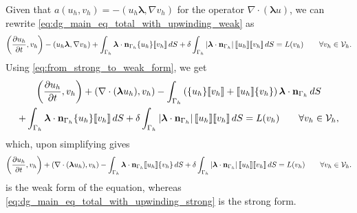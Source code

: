 \documentclass[oneside,a4paper,11pt]{report}
\begin{document}
Given that $a(u_h, v_h) = -(u_h \boldsymbol{\lambda}, \nabla v_h)$ for the operator $\nabla \cdot (\boldsymbol{\lambda} u)$, we can rewrite \cref{eq:dg_main_eq_total_with_upwinding_weak} as
\begin{equation}
    \left ( \frac{\partial u_h}{\partial t} , v_h \right ) - (u_h \boldsymbol{\lambda}, \nabla v_h) + \int_{\Gamma_h} \bm \lambda \cdot \mathbf{n}_{\Gamma_h} \{ u_h \} \llbracket v_h \rrbracket \, dS + \delta \int_{\Gamma_h} \left | \boldsymbol{\lambda} \cdot \mathbf{n}_{\Gamma_h} \right | \llbracket u_h \rrbracket \llbracket v_h \rrbracket \, dS = L(v_h) \qquad \forall v_h \in \mathcal{V}_h.
\end{equation}
Using \cref{eq:from_strong_to_weak_form}, we get
\begin{multline}
    \left ( \frac{\partial u_h}{\partial t} , v_h \right ) + (\nabla \cdot ( \boldsymbol{\lambda} u_h ), v_h ) -\int_{\Gamma_h} \left ( \{ u_h \} \llbracket v_h \rrbracket + \llbracket u_h \rrbracket \{ v_h \} \right ) \boldsymbol{\lambda} \cdot \mathbf{n}_{\Gamma_h} \, dS\\
    + \int_{\Gamma_h} \bm \lambda \cdot \mathbf{n}_{\Gamma_h} \{ u_h \} \llbracket v_h \rrbracket \, dS + \delta \int_{\Gamma_h} \left | \boldsymbol{\lambda} \cdot \mathbf{n}_{\Gamma_h} \right | \llbracket u_h \rrbracket \llbracket v_h \rrbracket \, dS = L(v_h) \qquad \forall v_h \in \mathcal{V}_h,
\end{multline}
which, upon simplifying gives
\begin{equation}
    \label{eq:dg_main_eq_total_with_upwinding_strong}
    \left ( \frac{\partial u_h}{\partial t} , v_h \right ) + (\nabla \cdot ( \boldsymbol{\lambda} u_h ), v_h ) -\int_{\Gamma_h} \boldsymbol{\lambda} \cdot \mathbf{n}_{\Gamma_h}\llbracket u_h \rrbracket \{ v_h \} \, dS + \delta \int_{\Gamma_h} \left | \boldsymbol{\lambda} \cdot \mathbf{n}_{\Gamma_h} \right | \llbracket u_h \rrbracket \llbracket v_h \rrbracket \, dS = L(v_h) \qquad \forall v_h \in \mathcal{V}_h.
\end{equation}
 is the weak form of the equation, whereas \cref{eq:dg_main_eq_total_with_upwinding_strong} is the strong form.

\end{document}

